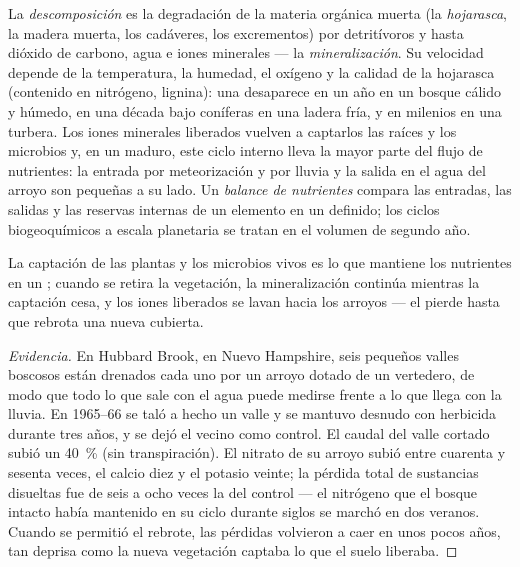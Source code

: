 \begin{definition}\label{def:b1:ecosystem-dynamics:decomposition}
La \emph{descomposición} es la degradación de la materia orgánica muerta (la
\emph{hojarasca}, la madera muerta, los cadáveres, los excrementos) por
detritívoros y  hasta dióxido de carbono, agua e iones
minerales --- la \emph{mineralización}. Su velocidad depende de la
temperatura, la humedad, el oxígeno y la calidad de la hojarasca (contenido
en nitrógeno, lignina): una  desaparece en un año en un bosque cálido y
húmedo, en una década bajo coníferas en una ladera fría, y en milenios en
una turbera. Los iones minerales liberados vuelven a captarlos las raíces y
los microbios y, en un  maduro, este ciclo interno lleva la mayor
parte del flujo de nutrientes: la entrada por meteorización y por lluvia y
la salida en el agua del arroyo son pequeñas a su lado. Un \emph{balance de
nutrientes} compara las entradas, las salidas y las reservas internas de un
elemento en un  definido; los ciclos biogeoquímicos a escala
planetaria se tratan en el volumen de segundo año.
\end{definition}

\begin{proposition}\label{prop:b1:ecosystem-dynamics:retention}
La captación de las plantas y los microbios vivos es lo que mantiene los
nutrientes en un ; cuando se retira la vegetación, la
mineralización continúa mientras la captación cesa, y los iones liberados se
lavan hacia los arroyos --- el  pierde hasta que rebrota una nueva
cubierta.
\end{proposition}
\begin{proof}[Evidencia]
En Hubbard Brook, en Nuevo Hampshire, seis pequeños valles boscosos están
drenados cada uno por un arroyo dotado de un vertedero, de modo que todo lo
que sale con el agua puede medirse frente a lo que llega con la lluvia. En
1965--66 se taló a hecho un valle y se mantuvo desnudo con herbicida durante
tres años, y se dejó el vecino como control. El caudal del valle cortado
subió un \qty{40}{\%} (sin transpiración). El nitrato de su arroyo subió
entre cuarenta y sesenta veces, el calcio diez y el potasio veinte; la
pérdida total de sustancias disueltas fue de seis a ocho veces la del
control --- el nitrógeno que el bosque intacto había mantenido en su ciclo
durante siglos se marchó en dos veranos. Cuando se permitió el rebrote, las
pérdidas volvieron a caer en unos pocos años, tan deprisa como la nueva
vegetación captaba lo que el suelo liberaba.
\end{proof}


